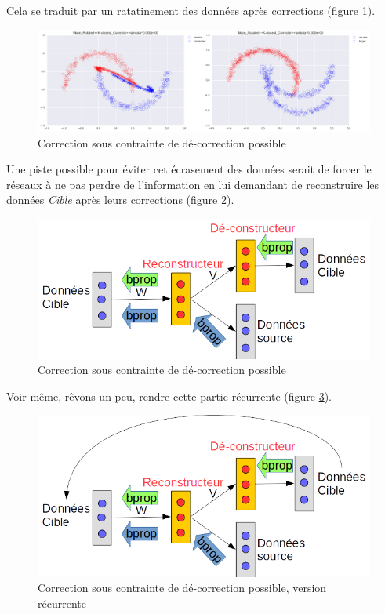 Cela se traduit par un ratatinement des données après corrections (figure \ref{fig:exhaustive-pb}).

\begin{figure}[H] %
\centering
\includegraphics[width=\linewidth]{fig/21-04-2016/exhaustive-pb.png}
\caption{Correction sous contrainte de dé-correction possible}
\label{fig:exhaustive-pb}
\end{figure}

Une piste possible pour éviter cet écrasement des données serait de forcer le 
réseaux à ne pas perdre de l'information en lui demandant de reconstruire les
données \emph{Cible} après leurs corrections (figure \ref{fig:de-correcteur}).

\begin{figure}[H] %
\centering
\includegraphics[width=0.45\linewidth]{fig/21-04-2016/Re-De-constructeur.png}
\caption{Correction sous contrainte de dé-correction possible}
\label{fig:de-correcteur}
\end{figure}

Voir même, rêvons un peu, rendre cette partie récurrente (figure \ref{fig:recurrent-de-correcteur}).
\begin{figure}[H] %
\centering
\includegraphics[width=0.45\linewidth]{fig/21-04-2016/Recurrent-correcteur.png}
\caption{Correction sous contrainte de dé-correction possible, version récurrente}
\label{fig:recurrent-de-correcteur}
\end{figure}

